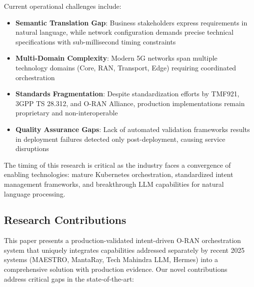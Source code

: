 \documentclass[conference]{IEEEtran}
\begin{document}
Current operational challenges include:
\begin{itemize}
\item \textbf{Semantic Translation Gap}: Business stakeholders express requirements in natural language, while network configuration demands precise technical specifications with sub-millisecond timing constraints
\item \textbf{Multi-Domain Complexity}: Modern 5G networks span multiple technology domains (Core, RAN, Transport, Edge) requiring coordinated orchestration
\item \textbf{Standards Fragmentation}: Despite standardization efforts by TMF921, 3GPP TS 28.312, and O-RAN Alliance, production implementations remain proprietary and non-interoperable
\item \textbf{Quality Assurance Gaps}: Lack of automated validation frameworks results in deployment failures detected only post-deployment, causing service disruptions
\end{itemize}

The timing of this research is critical as the industry faces a convergence of enabling technologies: mature Kubernetes orchestration, standardized intent management frameworks, and breakthrough LLM capabilities for natural language processing.

\subsection{Research Contributions}

This paper presents a production-validated intent-driven O-RAN orchestration system that uniquely integrates capabilities addressed separately by recent 2025 systems (MAESTRO, MantaRay, Tech Mahindra LLM, Hermes) into a comprehensive solution with production evidence. Our novel contributions address critical gaps in the state-of-the-art:
\end{document}
